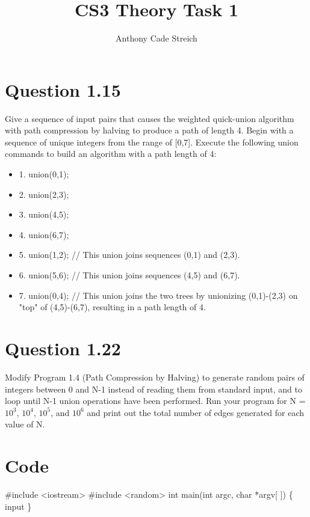 \documentclass[]{article}
\title{CS3 Theory Task 1}
\author{Anthony Cade Streich}
\begin{document}
\maketitle
\section*{Question 1.15}
Give a sequence of input pairs that causes the weighted quick-union algorithm with path compression by halving to produce a path of length 4.
\newline
\newline
\newline
Begin with a sequence of unique integers from the range of [0,7]. Execute the following union commands to build an algorithm with a path length of 4:

\begin{itemize}
	\item {1. union(0,1);}
	\item {2. union(2,3);}
	\item {3. union(4,5);}
	\item {4. union(6,7);}
	
	\item {5. union(1,2); // This union joins sequences (0,1) and (2,3).}
	\item {6. union(5,6); // This union joins sequences (4,5) and (6,7).}
	\item {7. union(0,4); // This union joins the two trees by unionizing (0,1)-(2,3) on "top" of (4,5)-(6,7), resulting in a path length of 4.}
\end{itemize}

\pagebreak

\section*{Question 1.22}
Modify Program 1.4 (Path Compression by Halving) to generate random pairs of integers between 0 and N-1 instead of reading them from standard input, and to loop until N-1 union operations have been performed. Run your program for N = $10^{3}$, $10^{4}$, $10^{5}$, and $10^{6}$ and print out the total number of edges generated for each value of N.

\section*{Code}
\#include <iostream>\newline
\#include <random>\newline
\newline
int main(int argc, char *argv[ ])\newline
\{\newline
\indent input
\newline \}
\end{document}
